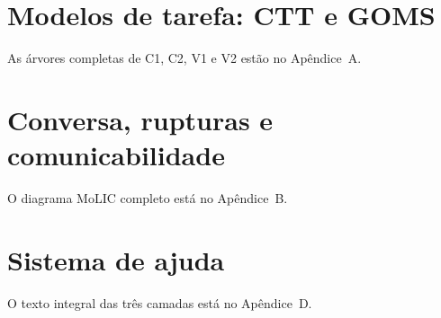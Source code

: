 \section{Modelos de tarefa: CTT e GOMS}\label{sec:tarefas}

\par As árvores completas de C1, C2, V1 e V2 estão no Apêndice~A.
\par
\section{Conversa, rupturas e comunicabilidade}

\par O diagrama MoLIC completo está no Apêndice~B.
\section{Sistema de ajuda}

\par O texto integral das três camadas está no Apêndice~D.
